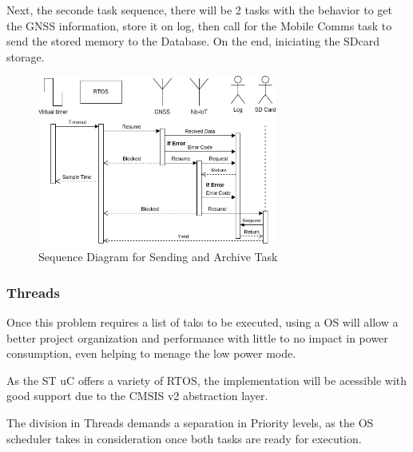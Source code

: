 Next, the seconde task sequence, there will be 2 tasks with the behavior to get the GNSS information, store it on log, then call for the Mobile Comms task to send the stored memory to the Database.
On the end, iniciating the SDcard storage. 
\begin{figure}[H]
    \centering
    \includegraphics[width=0.7\textwidth]{images/diagrams/sequence_diagram/sequence_diagram_2/Sequence Diagram.drawio.png}  %
    \caption{Sequence Diagram for Sending and Archive Task}
    \label{fig:Sequence Diagram for Sending and Archive Task}        
\end{figure}

\subsubsection{Threads} 
Once this problem requires a list of taks to be executed, using a OS will allow
a better project organization and performance with little to no impact in power consumption, even helping to menage the low power mode.

As the ST uC offers a variety of RTOS, the implementation will be acessible with good support due to the
CMSIS v2 abstraction layer.

The division in Threads demands a separation in Priority levels, as the OS scheduler takes in consideration 
once both tasks are ready for execution.  

